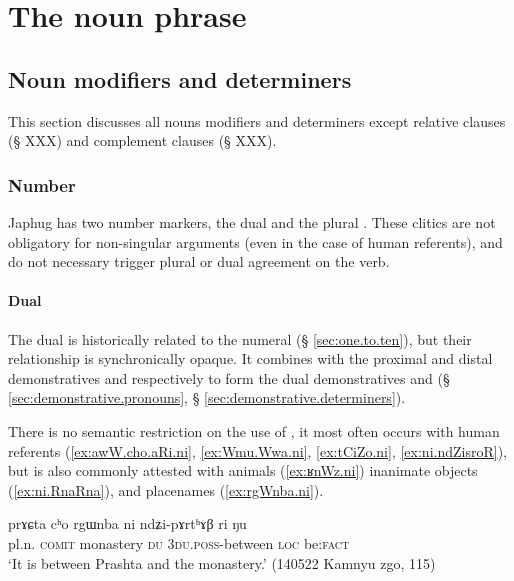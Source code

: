 \chapter{The noun phrase} \label{chap:noun.phrase}


\section{Noun modifiers and determiners}
This section discusses all nouns modifiers and determiners except relative clauses (§ XXX) and complement clauses (§ XXX). 
 
\subsection{Number}  \label{sec:number.determiners}
Japhug has two number markers, the dual  and the plural . These clitics are not obligatory for non-singular arguments (even in the case of human referents), and do not necessary trigger plural or dual agreement on the verb. 

\subsubsection{Dual} \label{sec:dual.determiners}
The dual  is historically related to the numeral  (§ \ref{sec:one.to.ten}), but their relationship is synchronically opaque. It combines with the proximal and distal demonstratives  and  respectively to form the dual demonstratives  and  (§ \ref{sec:demonstrative.pronouns}, § \ref{sec:demonstrative.determiners}).

There is no semantic restriction on the use of , it most often occurs with human referents (\ref{ex:awW.cho.aRi.ni}, \ref{ex:Wmu.Wwa.ni}, \ref{ex:tCiZo.ni}, \ref{ex:ni.ndZisroR}), but is also commonly attested with animals (\ref{ex:ʁnWz.ni}) inanimate objects (\ref{ex:ni.RnaRna}), and placenames (\ref{ex:rgWnba.ni}).

\begin{exe}
\ex \label{ex:rgWnba.ni}
\gll prɤɕta cʰo rgɯnba ni ndʑi-pɤrtʰɤβ ri ŋu \\
pl.n. \textsc{comit} monastery \textsc{du} \textsc{3du}.\textsc{poss}-between \textsc{loc} be:\textsc{fact} \\
\glt `It is between Prashta and the monastery.' (140522 Kamnyu zgo, 115)
\end{exe}

